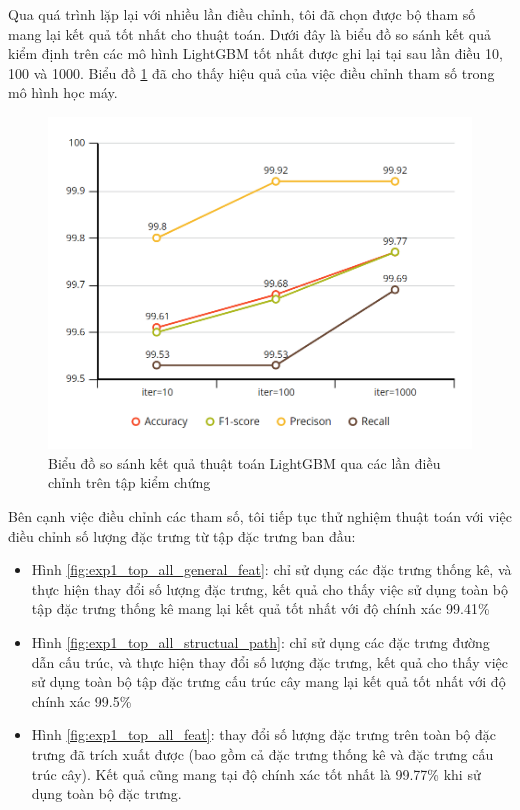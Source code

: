 \documentclass[./../main.tex]{subfiles}
\begin{document}
Qua quá trình lặp lại với nhiều lần điều chỉnh, tôi đã chọn được bộ tham số mang lại kết quả tốt nhất cho thuật toán. Dưới đây là biểu đồ so sánh kết quả kiểm định trên các mô hình LightGBM tốt nhất được ghi lại tại sau lần điều 10, 100 và 1000. Biểu đồ \ref{fig:exp1_trials} đã cho thấy hiệu quả của việc điều chỉnh tham số trong mô hình học máy.

\begin{figure}[H]
	\centering
	\includegraphics[width=\linewidth]{./images/exp1_trials.png}
	\caption{Biểu đồ so sánh kết quả thuật toán LightGBM qua các lần điều chỉnh trên tập kiểm chứng}
	\label{fig:exp1_trials}
\end{figure}


Bên cạnh việc điều chỉnh các tham số, tôi tiếp tục thử nghiệm thuật toán với việc điều chỉnh số lượng đặc trưng từ tập đặc trưng ban đầu:

\begin{itemize}
	\item
	      Hình \ref{fig:exp1_top_all_general_feat}: chỉ sử dụng các đặc trưng thống kê, và thực hiện thay đổi số lượng đặc trưng, kết quả cho thấy việc sử dụng toàn bộ tập đặc trưng thống kê mang lại kết quả tốt nhất với độ chính xác 99.41\%
	\item
	      Hình \ref{fig:exp1_top_all_structual_path}: chỉ sử dụng các đặc trưng đường dẫn cấu trúc, và thực hiện thay đổi số lượng đặc trưng, kết quả cho thấy việc sử dụng toàn bộ tập đặc trưng cấu trúc cây mang lại kết quả tốt nhất với độ chính xác 99.5\%
	\item
	      Hình \ref{fig:exp1_top_all_feat}: thay đổi số lượng đặc trưng trên toàn bộ đặc trưng đã trích xuất được (bao gồm cả đặc trưng thống kê và đặc trưng cấu trúc cây). Kết quả cũng mang tại độ chính xác tốt nhất là 99.77\% khi sử dụng toàn bộ đặc trưng.
\end{itemize}
\end{document}

